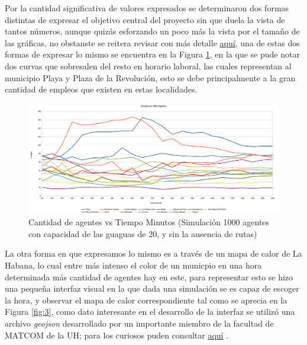 \documentclass[a4paper,12pt]{article}
\begin{document}
Por la cantidad significativa de valores expresados se determinaron dos formas distintas de expresar el objetivo central del proyecto sin que duela la vista de tantos n\'umeros, aunque quiz\'as esforzando un poco m\'as la vista por el tamaño de las gráficas, no obstanste se reitera revisar con más detalle \href{https://github.com/YoanRene/AI-Sim/tree/master/docs/imgs}{aqu\'i}, una de estas dos formas de expresar lo mismo se encuentra en la Figura \ref{fig:2}, en la que se pude notar dos curvas que sobresalen del resto en horario laboral, las cuales representan al municipio Playa y Plaza de la Revoluci\'on, esto se debe principalmente a la gran cantidad de empleos que existen en estas localidades.

\begin{figure}[H]
    \hspace{-3cm}
    \includegraphics[width=1.4\textwidth]{imgs/s1000c20.png}
    \caption{Cantidad de agentes vs Tiempo Minutos (Simulaci\'on 1000 agentes con capacidad de las guaguas de 20, y sin la ausencia de rutas)}
    \label{fig:2}
\end{figure}

La otra forma en que expresamos lo mismo es a través de un mapa de calor de La Habana, lo cual entre más intenso el color de un municpio en una hora determinada más cantidad de agentes hay en este, para representar esto se hizo una pequeña interfaz visual en la que dada una simulación se es capaz de escoger la hora, y observar el mapa de calor correspondiente tal como se aprecia en la Figura \ref{fig:3}, como dato interesante en el desarrollo de la interfaz se utilizó una archivo \textit{geojson} desarrollado por un importante miembro de la facultad de MATCOM de la UH; para los curiosos puden consultar \href{https://github.com/yudivian/cuba-geojsons}{aqu\'i} .
\end{document}
